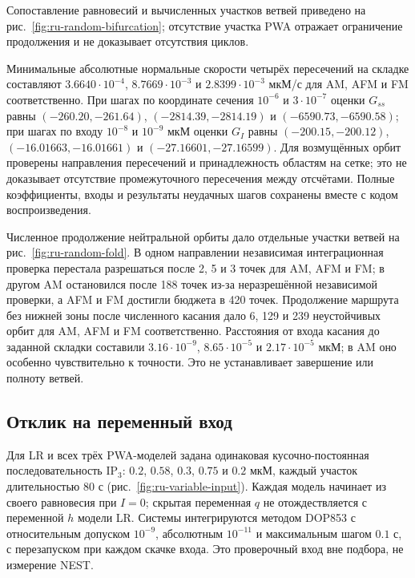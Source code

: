 Сопоставление равновесий и вычисленных участков ветвей приведено на рис.~\ref{fig:ru-random-bifurcation}; отсутствие участка PWA отражает ограничение продолжения и не доказывает отсутствия циклов.

Минимальные абсолютные нормальные скорости четырёх пересечений на складке составляют $3.6640\cdot10^{-4}$, $8.7669\cdot10^{-3}$ и $2.8399\cdot10^{-3}$ мкМ/с для AM, AFM и FM соответственно. При шагах по координате сечения $10^{-6}$ и $3\cdot10^{-7}$ оценки $G_{ss}$ равны $(-260.20,-261.64)$, $(-2814.39,-2814.19)$ и $(-6590.73,-6590.58)$; при шагах по входу $10^{-8}$ и $10^{-9}$ мкМ оценки $G_I$ равны $(-200.15,-200.12)$, $(-16.01663,-16.01661)$ и $(-27.16601,-27.16599)$. Для возмущённых орбит проверены направления пересечений и принадлежность областям на сетке; это не доказывает отсутствие промежуточного пересечения между отсчётами. Полные коэффициенты, входы и результаты неудачных шагов сохранены вместе с кодом воспроизведения.

Численное продолжение нейтральной орбиты дало отдельные участки ветвей на рис.~\ref{fig:ru-random-fold}. В одном направлении независимая интеграционная проверка перестала разрешаться после 2, 5 и 3 точек для AM, AFM и FM; в другом AM остановился после 188 точек из-за неразрешённой независимой проверки, а AFM и FM достигли бюджета в 420 точек. Продолжение маршрута без нижней зоны после численного касания дало 6, 129 и 239 неустойчивых орбит для AM, AFM и FM соответственно. Расстояния от входа касания до заданной складки составили $3.16\cdot10^{-9}$, $8.65\cdot10^{-5}$ и $2.17\cdot10^{-5}$ мкМ; в AM оно особенно чувствительно к точности. Это не устанавливает завершение или полноту ветвей.

\subsection{Отклик на переменный вход}
Для LR и всех трёх PWA-моделей задана одинаковая кусочно-постоянная последовательность IP$_3$: $0.2$, $0.58$, $0.3$, $0.75$ и $0.2$ мкМ, каждый участок длительностью 80 с (рис.~\ref{fig:ru-variable-input}). Каждая модель начинает из своего равновесия при $I=0$; скрытая переменная $q$ не отождествляется с переменной $h$ модели LR. Системы интегрируются методом DOP853 с относительным допуском $10^{-9}$, абсолютным $10^{-11}$ и максимальным шагом $0.1$ с, с перезапуском при каждом скачке входа. Это проверочный вход вне подбора, не измерение NEST.

